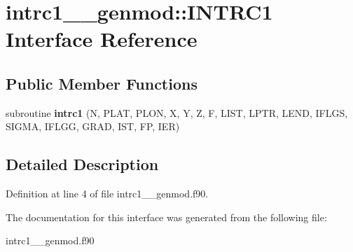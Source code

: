 \hypertarget{interfaceintrc1____genmod_1_1_i_n_t_r_c1}{\section{intrc1\+\_\+\+\_\+genmod\+:\+:I\+N\+T\+R\+C1 Interface Reference}
\label{interfaceintrc1____genmod_1_1_i_n_t_r_c1}
}
\subsection*{Public Member Functions}
\begin{DoxyCompactItemize}
\item 
\hypertarget{interfaceintrc1____genmod_1_1_i_n_t_r_c1_a013e54693bd756a10f30a71668b2b6e7}{subroutine {\bfseries intrc1} (N, P\+L\+A\+T, P\+L\+O\+N, X, Y, Z, F, L\+I\+S\+T, L\+P\+T\+R, L\+E\+N\+D, I\+F\+L\+G\+S, S\+I\+G\+M\+A, I\+F\+L\+G\+G, G\+R\+A\+D, I\+S\+T, F\+P, I\+E\+R)}\label{interfaceintrc1____genmod_1_1_i_n_t_r_c1_a013e54693bd756a10f30a71668b2b6e7}

\end{DoxyCompactItemize}


\subsection{Detailed Description}


Definition at line 4 of file intrc1\+\_\+\+\_\+genmod.\+f90.



The documentation for this interface was generated from the following file\+:\begin{DoxyCompactItemize}
\item 
intrc1\+\_\+\+\_\+genmod.\+f90\end{DoxyCompactItemize}
